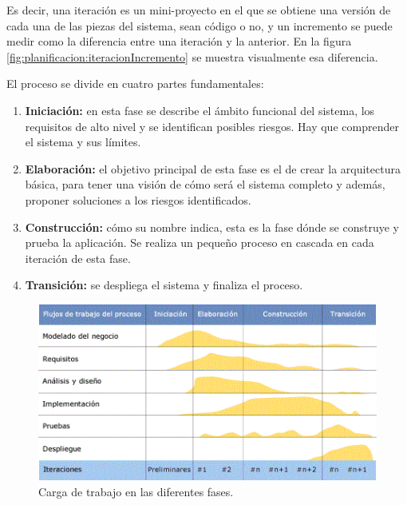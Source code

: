 Es decir, una iteración es un mini-proyecto en el que se obtiene una versión de cada una de las piezas del sistema, sean código o no, y un incremento se puede medir como la diferencia entre una iteración y la anterior. En la figura \ref{fig:planificacion:iteracionIncremento} se muestra visualmente esa diferencia.
\newline

El proceso se divide en cuatro partes fundamentales:

\begin{enumerate}

	\item \textbf{Iniciación:} en esta fase se describe el ámbito funcional del sistema, los requisitos de alto nivel y se identifican posibles riesgos. Hay que comprender el sistema y sus límites.

	\item \textbf{Elaboración:} el objetivo principal de esta fase es el de crear la arquitectura básica, para tener una visión de cómo será el sistema completo y además, proponer soluciones a los riesgos identificados.

	\item \textbf{Construcción:} cómo su nombre indica, esta es la fase dónde se construye y prueba la aplicación. Se realiza un pequeño proceso en cascada en cada iteración de esta fase.

	\item \textbf{Transición:} se despliega el sistema y finaliza el proceso.

\end{enumerate}


\begin{figure}[!h]
    \centering
    \includegraphics[]{planificacion/trabajoFases}
    \caption{Carga de trabajo en las diferentes fases.\cite{RUP:2003}}
    \label{fig:planificacion:trabajoFases}
\end{figure}

